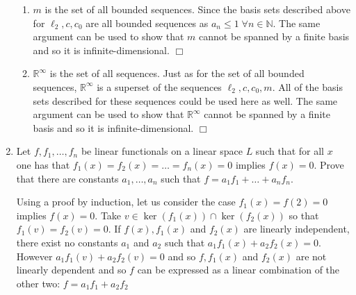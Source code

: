 \documentclass[12pt,letterpaper,reqno]{amsart}
\newcommand{\R}{\mathbb R}
\newcommand{\N}{\mathbb N}
\begin{document}
\begin{enumerate}[1.]
\begin{enumerate}
        \item $m$ is the set of all bounded sequences. Since the basis sets described above for $\ell_2, c, c_0$ are all bounded sequences as $a_n \leq 1 \; \forall n \in \N$. The same argument can be used to show that $m$ cannot be spanned by a finite basis and so it is infinite-dimensional. $\Box$
        \item $\R^\infty$ is the set of all sequences. Just as for the set of all bounded sequences, $\R^\infty$ is a superset of the sequences $\ell_2, c, c_0, m$. All of the basis sets described for these sequences could be used here as well. The same argument can be used to show that $\R^\infty$ cannot be spanned by a finite basis and so it is infinite-dimensional. $\Box$
    \end{enumerate}
\item Let $f, f_1, \ldots, f_n$ be linear functionals on a linear space $L$ such that for all $x$ one has that $f_1(x)=f_2(x)=\ldots=f_n(x)=0$ implies $f(x)=0$. Prove that there are constants $a_1, \ldots, a_n$ such that $f=a_1f_1+\ldots+a_nf_n$.
\begin{flushleft}
    Using a proof by induction, let us consider the case $f_1(x)=f(2)=0$ implies $f(x)=0$. Take $v\in\ker(f_1(x))\cap\ker(f_2(x))$ so that $f_1(v)=f_2(v)=0$. If $f(x), f_1(x)$ and $f_2(x)$ are linearly independent, there exist no constants $a_1$ and $a_2$ such that $a_1f_1(x) + a_2f_2(x) = 0$. However $a_1f_1(v) + a_2f_2(v) = 0$ and so $f, f_1(x)$ and $f_2(x)$ are not linearly dependent and so $f$ can be expressed as a linear combination of the other two: $f = a_1f_1 + a_2f_2$
    \newline
    
    

\end{flushleft}
\end{enumerate}
\end{document}
